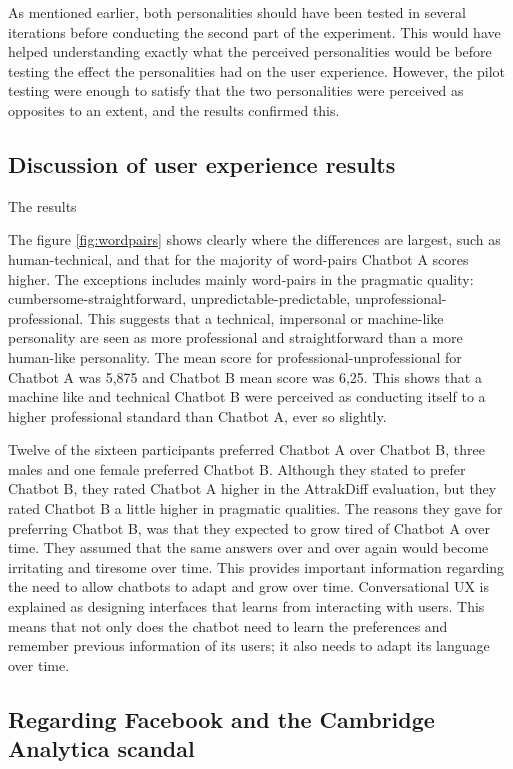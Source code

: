 As mentioned earlier, both personalities should have been tested in several iterations before conducting the second part of the experiment. This would have helped understanding exactly what the perceived personalities would be before testing the effect the personalities had on the user experience. However, the pilot testing were enough to satisfy that the two personalities were perceived as opposites to an extent, and the results confirmed this.


\subsection{Discussion of user experience results}
The results

The figure \ref{fig:wordpairs} shows clearly where the differences are largest, such as human-technical, and that for the majority of word-pairs Chatbot A scores higher. The exceptions includes mainly word-pairs in the pragmatic quality: cumbersome-straightforward, unpredictable-predictable, unprofessional-professional. This suggests that a technical, impersonal or machine-like personality are seen as more professional and straightforward than a more human-like personality. The mean score for professional-unprofessional for Chatbot A was 5,875 and Chatbot B mean score was 6,25. This shows that a machine like and technical Chatbot B were perceived as conducting itself to a higher professional standard than Chatbot A, ever so slightly.

Twelve of the sixteen participants preferred Chatbot A over Chatbot B, three males and one female preferred Chatbot B. Although they stated to prefer Chatbot B, they rated Chatbot A higher in the AttrakDiff evaluation, but they rated Chatbot B a little higher in pragmatic qualities. The reasons they gave for preferring Chatbot B, was that they expected to grow tired of Chatbot A over time. They assumed that the same answers over and over again would become irritating and tiresome over time. This provides important information regarding the need to allow chatbots to adapt and grow over time. Conversational UX is explained as designing interfaces that learns from interacting with users. This means that not only does the chatbot need to learn the preferences and remember previous information of its users; it also needs to adapt its language over time.

\subsection{Regarding Facebook and the Cambridge Analytica scandal}

